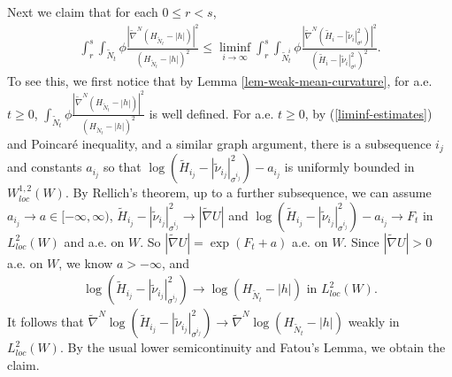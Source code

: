 \documentclass[11pt, letterpaper]{amsart}
\theoremstyle{definition}
\theoremstyle{remark}
\begin{document}
Next we claim that for each $0 \leq r<s$,
\begin{align*}
	\int_{r}^{s} \int_{\tilde{N}_{t}} \phi \frac{|\tilde{\nabla }^{N} (H_{\tilde{N}_t}- |h|) |^2}{(H_{\tilde{N}_t} - |h| )^2} \leq \liminf_{i\to \infty}  \int_{r}^{s} \int_{\tilde{N}_{t}^{i}} \phi \frac{|\tilde{\nabla }^{N}(\tilde{H}_i - |\tilde{\nu }_i|^2_{\sigma ^{i}})|^2}{ (\tilde{H}_i - |\tilde{\nu }_i|^2_{\sigma ^{i}})^2}.
\end{align*} 
To see this, we first notice that by Lemma \ref{lem-weak-mean-curvature}, for a.e. $t \geq 0$, $\int_{\tilde{N}_{t}} \phi \frac{|\tilde{\nabla }^{N} (H_{\tilde{N}_t}- |h|) |^2}{(H_{\tilde{N}_t} - |h| )^2}$ is well defined. For a.e. $t \geq 0$, by (\ref{liminf-estimates}) and Poincar\'e inequality, and a similar graph argument, there is a subsequence $i_j$ and constants $a_{i_j}$ so that $\log (\tilde{H}_{i_j} - |\tilde{\nu }_{i_j}|^2_{\sigma ^{i_j}}) - a_{i_j}$ is uniformly bounded in $W^{1,2}_{loc}(W)$. By Rellich's theorem, up to a further subsequence, we can assume $a_{i_j} \to a \in [-\infty, \infty)$, $\tilde{H}_{i_j} - |\tilde{\nu }_{i_j}|^2_{\sigma ^{i_j}} \to |\tilde{\nabla }U|$ and $\log (\tilde{H}_{i_j} - |\tilde{\nu }_{i_j}|^2_{\sigma ^{i_j}}) - a_{i_j} \to F_t$ in $L^2_{loc}(W)$ and a.e. on $W$. So $|\tilde{\nabla }U| = \exp(F_t+ a)$ a.e. on $W$. Since $|\tilde{\nabla }U|>0$ a.e. on $W$, we know $a> -\infty$, and
\begin{align*}
	\log (\tilde{H}_{i_j} - |\tilde{\nu }_{i_j}|^2_{\sigma ^{i_j}}) \to \log (H_{\tilde{N}_t} - |h| ) \text{ in } L^2_{loc}(W).
\end{align*} 
It follows that $\tilde{\nabla }^{N}\log (\tilde{H}_{i_j} - |\tilde{\nu }_{i_j}|^2_{\sigma ^{i_j}}) \to \tilde{\nabla }^{N}\log (H_{\tilde{N}_t} - |h| )$ weakly in $L^2_{loc}(W)$. 
By the usual lower semicontinuity and Fatou's Lemma, we obtain the claim.
\end{document}
